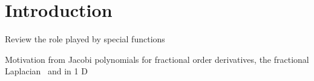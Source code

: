\section{Introduction}

Review the role played by special functions

Motivation from Jacobi polynomials for fractional order derivatives,
the fractional Laplacian~\cite{MR3640641}
and in 1 D~\cite{MR3787393}
